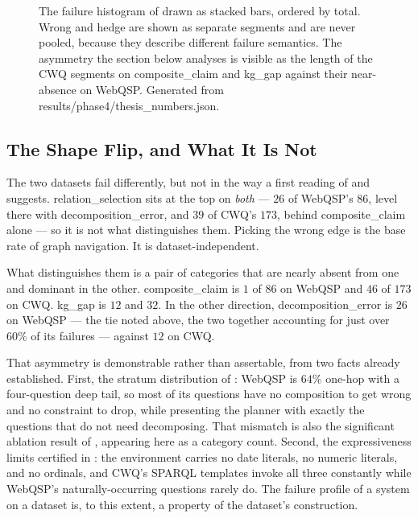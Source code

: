 \begin{figure}[!tbp]
  \begin{center}
    
  \end{center}
  \caption[Failure categories by dataset and polarity]{The failure histogram of
   drawn as stacked bars, ordered by total. Wrong and hedge
  are shown as separate segments and are never pooled, because they describe
  different failure semantics. The asymmetry the section below analyses is
  visible as the length of the CWQ segments on \textsf{composite\_claim} and
  \textsf{kg\_gap} against their near-absence on WebQSP. Generated from
  \textsf{results/phase4/thesis\_numbers.json}.}
  \label{fig:histogram}
\end{figure}

\subsection{The Shape Flip, and What It Is Not}

The two datasets fail differently, but not in the way a first reading of
 and  suggests.
\textsf{relation\_selection} sits at the top on \emph{both} --- $26$ of WebQSP's
$86$, level there with \textsf{decomposition\_error}, and $39$ of CWQ's $173$,
behind \textsf{composite\_claim} alone --- so it is not what distinguishes them.
Picking the wrong edge is the base rate of graph navigation. It is
dataset-independent.

What distinguishes them is a pair of categories that are nearly absent from one
and dominant in the other. \textsf{composite\_claim} is $1$ of $86$ on WebQSP
and $46$ of $173$ on CWQ. \textsf{kg\_gap} is $12$ and $32$. In the other
direction, \textsf{decomposition\_error} is $26$ on WebQSP --- the tie noted
above, the two together accounting for just over $60\%$ of its failures ---
against $12$ on CWQ.

That asymmetry is demonstrable rather than assertable, from two facts already
established. First, the stratum distribution of : WebQSP is
$64\%$ one-hop with a four-question deep tail, so most of its questions have no
composition to get wrong and no constraint to drop, while presenting the planner
with exactly the questions that do not need decomposing. That mismatch is also
the significant ablation result of , appearing here as a
category count. Second, the expressiveness limits certified in
: the environment carries no date literals, no numeric
literals, and no ordinals, and CWQ's SPARQL templates invoke all three
constantly while WebQSP's naturally-occurring questions rarely do. The failure
profile of a system on a dataset is, to this extent, a property of the dataset's
construction.


